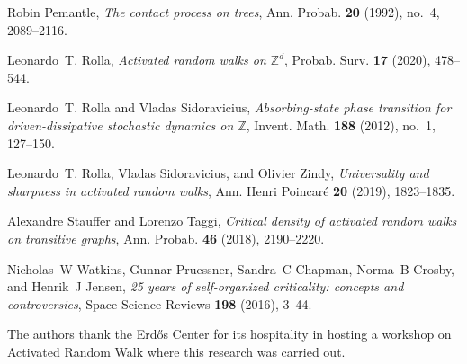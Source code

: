 \documentclass[ECP]{ejpecp} %
\begin{document}
\begin{thebibliography}{}
Robin Pemantle, \emph{The contact process on trees}, Ann. Probab.
\textbf{20} (1992), no.~4, 2089--2116. 

Leonardo~T. Rolla,
\emph{Activated random walks on {$\mathbb{Z}^{d}$}}, Probab. Surv.
\textbf{17} (2020), 478--544. 

Leonardo~T. Rolla and Vladas Sidoravicius,
\emph{Absorbing-state phase transition for driven-dissipative stochastic
dynamics on {$\mathbb{Z}$}}, Invent. Math. \textbf{188} (2012), no.~1, 127--150.

Leonardo~T. Rolla, Vladas Sidoravicius, and Olivier Zindy,
\emph{Universality and sharpness in activated random walks}, Ann. Henri
Poincar{\'e} \textbf{20} (2019), 1823--1835.

Alexandre Stauffer and Lorenzo Taggi,
\emph{Critical density of activated random walks on transitive graphs},
Ann. Probab. \textbf{46} (2018), 2190--2220.

Nicholas~W Watkins, Gunnar Pruessner, Sandra~C Chapman, Norma~B Crosby,
and Henrik~J Jensen,
\emph{25 years of self-organized criticality: concepts and controversies},
Space Science Reviews \textbf{198} (2016), 3--44.
\end{thebibliography}


\begin{acks}
The authors thank the Erd\H{o}s
Center for its hospitality in hosting a workshop on Activated Random Walk
where this research was carried out.
\end{acks}
\end{document}
